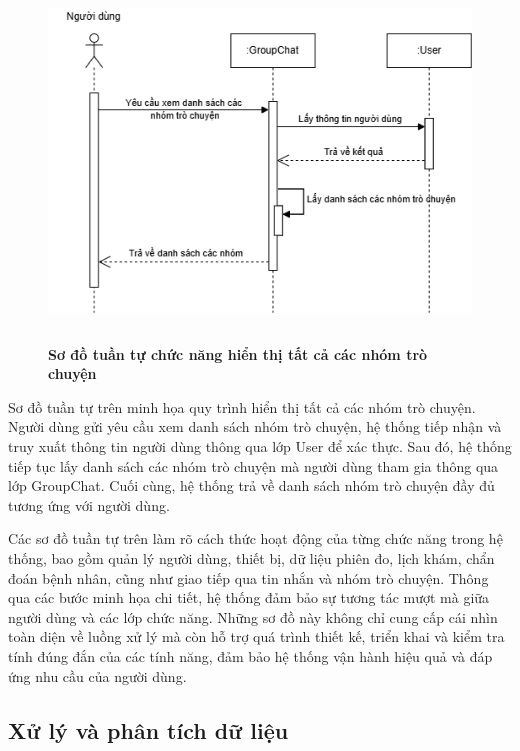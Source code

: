 \begin{figure}[H]
	\centering
	\includegraphics[width=12.5cm,height=9.5cm]{Images/sequence/chat/getGroupChat.drawio.png}
	\caption[Sơ đồ tuần tự chức năng hiển thị tất cả các nhóm trò chuyện]{\bfseries \fontsize{12pt}{0pt}
		\selectfont Sơ đồ tuần tự chức năng hiển thị tất cả các nhóm trò chuyện}
	\label{sequence_get_gr} %
\end{figure}
Sơ đồ tuần tự trên minh họa quy trình hiển thị tất cả các nhóm trò chuyện. Người dùng gửi yêu cầu xem danh sách nhóm trò chuyện, hệ thống tiếp nhận và truy xuất thông tin người dùng thông qua lớp User để xác thực.
Sau đó, hệ thống tiếp tục lấy danh sách các nhóm trò chuyện mà người dùng tham gia thông qua lớp GroupChat. Cuối cùng, hệ thống trả về danh sách nhóm trò chuyện đầy đủ tương ứng với người dùng.

Các sơ đồ tuần tự trên làm rõ cách thức hoạt động của từng chức năng trong hệ thống, bao gồm quản lý người dùng, thiết bị, dữ liệu phiên đo, lịch khám, chẩn đoán bệnh nhân, cũng như giao tiếp qua tin nhắn và nhóm trò chuyện.
Thông qua các bước minh họa chi tiết, hệ thống đảm bảo sự tương tác mượt mà giữa người dùng và các lớp chức năng. Những sơ đồ này không chỉ cung cấp cái nhìn toàn diện về luồng xử lý mà còn hỗ trợ quá trình thiết kế,
triển khai và kiểm tra tính đúng đắn của các tính năng, đảm bảo hệ thống vận hành hiệu quả và đáp ứng nhu cầu của người dùng.

\subsection{Xử lý và phân tích dữ liệu}

